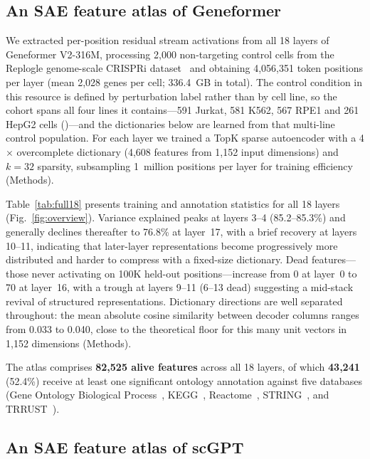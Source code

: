 \subsection*{An SAE feature atlas of Geneformer}
\label{sec:atlas}

We extracted per-position residual stream activations from all 18 layers of Geneformer V2-316M,
processing 2,000 non-targeting control cells from the Replogle genome-scale CRISPRi
dataset~\cite{replogle2022mapping} and obtaining 4,056,351 token positions per layer (mean 2,028
genes per cell; 336.4~GB in total). The control condition in this resource is defined by
perturbation label rather than by cell line, so the cohort spans all four lines it contains---591
Jurkat, 581 K562, 567 RPE1 and 261 HepG2 cells ()---and the dictionaries
below are learned from that multi-line control population. For each layer we trained a TopK sparse
autoencoder with a
4$\times$ overcomplete dictionary (4,608 features from 1,152 input dimensions) and $k{=}32$
sparsity, subsampling 1~million positions per layer for training efficiency (Methods).

Table~\ref{tab:full18} presents training and annotation statistics for all 18 layers
(Fig.~\ref{fig:overview}). Variance explained peaks at layers 3--4 (85.2--85.3\%) and generally
declines thereafter to 76.8\% at layer~17, with a brief recovery at layers 10--11, indicating that
later-layer representations become progressively more distributed and harder to compress with a
fixed-size dictionary. Dead features---those never activating on 100K held-out positions---increase
from 0 at layer~0 to 70 at layer~16, with a trough at layers 9--11 (6--13 dead) suggesting a
mid-stack revival of structured representations. Dictionary directions are well separated
throughout: the mean absolute cosine similarity between decoder columns ranges from 0.033 to 0.040,
close to the theoretical floor for this many unit vectors in 1,152 dimensions (Methods).

The atlas comprises \textbf{82,525 alive features} across all 18 layers, of which \textbf{43,241}
(52.4\%) receive at least one significant ontology annotation against five databases (Gene Ontology
Biological Process~\cite{ashburner2000go}, KEGG~\cite{kanehisa2000kegg},
Reactome~\cite{jassal2020reactome}, STRING~\cite{szklarczyk2023string}, and
TRRUST~\cite{han2018trrust}).

\subsection*{An SAE feature atlas of scGPT}
\label{sec:scgpt_atlas}

